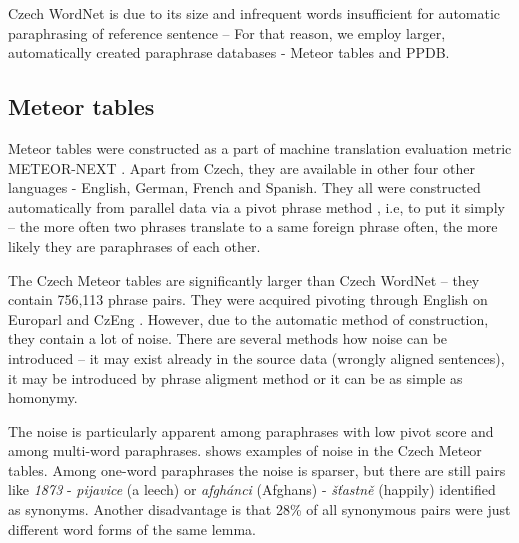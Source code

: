Czech WordNet is due to its size and infrequent words insufficient for automatic paraphrasing of reference sentence --
For that reason, we employ larger, automatically created paraphrase databases - Meteor tables and PPDB.
 
\subsection{Meteor tables} %
\label{meteori}
Meteor tables were constructed as a part of machine translation evaluation metric METEOR-NEXT \citep{meteor-tables}. 
Apart from Czech, they are available in other four other languages - English, German, French and Spanish. 
They all were constructed automatically from parallel data via a pivot phrase method \citep{pivoting}, i.e, to put it simply --  
the more often two phrases translate to a same foreign phrase often, the more likely they are paraphrases of each other. 

The Czech Meteor tables are significantly larger than Czech WordNet -- they contain 756,113 phrase pairs. 
They were acquired pivoting through English on Europarl and CzEng \citep{czeng10:lrec2012}. 
However, due to the automatic method of construction, they contain a lot of noise. 
There are several methods how noise can be introduced -- it may exist already in the source data (wrongly aligned sentences), it may be introduced by phrase aligment method or it can be as simple as homonymy. 


The noise is particularly apparent among paraphrases with low pivot score and among multi-word paraphrases.  shows examples of noise in the Czech Meteor tables. 
Among one-word paraphrases the noise is sparser, but there are still pairs like \textit{1873} - \textit{pijavice} (a leech) or \textit{afgh\'{a}nci} (Afghans) - \textit{š\v{t}astně} (happily) identified as synonyms. 
Another disadvantage is that 28\% of all synonymous pairs were just different word forms of the same lemma.

